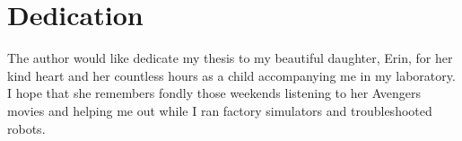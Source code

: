 \chapter*{Dedication}
The author would like dedicate my thesis to my beautiful daughter, Erin, for her
kind heart and her countless hours as a child accompanying me in my laboratory. I hope that she
remembers fondly those weekends listening to her Avengers movies and helping me out while I ran factory simulators and troubleshooted robots.
